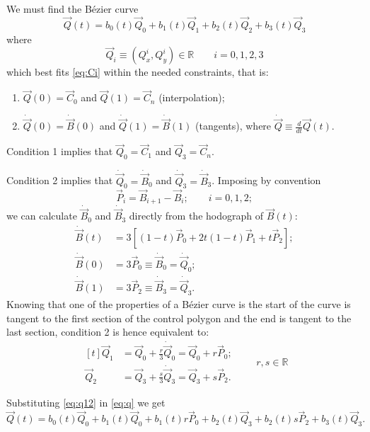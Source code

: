 \documentclass{scrartcl}
\newcommand\V[1]{\vec{#1}}
\newcommand\D[1]{\dot{#1}}
\newcommand\DV[1]{\D{\V{#1}}}
\begin{document}
We must find the Bézier curve
\begin{equation}\label{eq:q}
\V{Q}(t) = b_0(t) \V{Q}_0 + b_1(t) \V{Q}_1 + b_2(t) \V{Q}_2 + b_3(t) \V{Q}_3
\end{equation}
where
\begin{equation*}
\V{Q}_i \equiv ( Q^i_x, Q^i_y ) \in \mathbb{R} \qquad i = 0,1,2,3
\end{equation*}
which best fits \eqref{eq:Ci} within the needed constraints, that is:
\begin{enumerate}
\item $\V{Q}(0) = \V{C}_0$ and $\V{Q}(1) = \V{C}_n$ (interpolation);
\item $\DV{Q}(0) = \DV{B}(0)$ and $\DV{Q}(1) = \DV{B}(1)$ (tangents),
where $\DV{Q} \equiv \frac{d}{dt} \V{Q}(t)$.
\end{enumerate}

\medskip
Condition 1 implies that $\V{Q}_0 = \V{C}_1$ and $\V{Q}_3 = \V{C}_n$.

Condition 2 implies that $\DV{Q}_0 = \DV{B}_0$ and
$\DV{Q}_3 = \DV{B}_3$. Imposing by convention
\begin{equation}\label{eq:pi}
    \V{P}_i = \V{B}_{i+1} - \V{B}_i; \qquad i = 0, 1, 2;
\end{equation}
we can calculate $\DV{B}_0$ and $\DV{B}_3$ directly from the hodograph
of $\V{B}(t)$:
\begin{align*}
    \DV{B}(t) &= 3 \left[ (1-t) \V{P}_0 + 2t(1-t) \V{P}_1 + t \V{P}_2 \right]; \\
    \DV{B}(0) &= 3 \V{P}_0 \equiv \DV{B}_0 = \DV{Q}_0; \\
    \DV{B}(1) &= 3 \V{P}_2 \equiv \DV{B}_3 = \DV{Q}_3.
\end{align*}
Knowing that one of the properties of a Bézier curve is the start of the
curve is tangent to the first section of the control polygon and the end
is tangent to the last section, condition 2 is hence equivalent to:
\begin{equation}\label{eq:q12}
\begin{aligned}[t]
    \V{Q}_1 &= \V{Q}_0 + \frac{r}{3} \DV{Q}_0 = \V{Q}_0 + r \V{P}_0; \\
    \V{Q}_2 &= \V{Q}_3 + \frac{s}{3} \DV{Q}_3 = \V{Q}_3 + s \V{P}_2.
\end{aligned}
\qquad r, s \in \mathbb{R}
\end{equation}

Substituting \eqref{eq:q12} in \eqref{eq:q} we get
\begin{equation*}
\V{Q}(t) = b_0(t) \V{Q}_0 + b_1(t) \V{Q}_0 + b_1(t) r \V{P}_0 +
b_2(t) \V{Q}_3 + b_2(t) s \V{P}_2 + b_3(t) \V{Q}_3.
\end{equation*}
\end{document}
